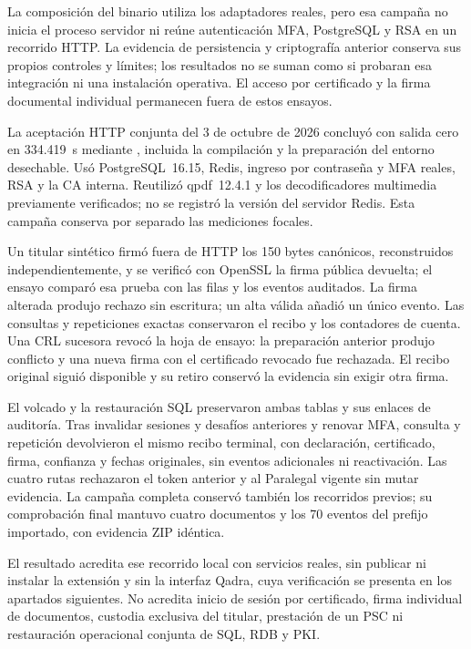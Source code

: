La composición del binario utiliza los adaptadores reales, pero esa campaña
no inicia el proceso servidor ni reúne autenticación MFA, PostgreSQL y RSA en
un recorrido HTTP. La evidencia de persistencia y criptografía anterior conserva
sus propios controles y límites; los resultados no se suman como si probaran
esa integración ni una instalación operativa. El acceso por certificado y la
firma documental individual permanecen fuera de estos ensayos.

La aceptación HTTP conjunta del 3 de octubre de 2026 concluyó con salida cero
en 334.419~s mediante , incluida la compilación
y la preparación del entorno desechable. Usó PostgreSQL~16.15, Redis, ingreso
por contraseña y MFA reales, RSA y la CA interna. Reutilizó qpdf~12.4.1 y los
decodificadores multimedia previamente verificados; no se registró la versión
del servidor Redis. Esta campaña conserva por separado las mediciones focales.

Un titular sintético firmó fuera de HTTP los 150 bytes canónicos, reconstruidos
independientemente, y se verificó con OpenSSL la firma pública devuelta; el
ensayo comparó esa prueba con las filas y los eventos auditados. La firma
alterada produjo rechazo sin escritura; un alta válida añadió un único evento. Las consultas y repeticiones
exactas conservaron el recibo y los contadores de cuenta. Una CRL sucesora
revocó la hoja de ensayo: la preparación anterior produjo conflicto y una
nueva firma con el certificado revocado fue rechazada. El recibo original
siguió disponible y su retiro conservó la evidencia sin exigir otra firma.

El volcado y la restauración SQL preservaron ambas tablas y sus enlaces de
auditoría. Tras invalidar sesiones y desafíos anteriores y renovar MFA,
consulta y repetición devolvieron el mismo recibo terminal, con declaración,
certificado, firma, confianza y fechas originales, sin eventos adicionales ni
reactivación. Las cuatro rutas rechazaron el token anterior y al Paralegal
vigente sin mutar evidencia. La campaña completa conservó también los
recorridos previos; su comprobación final mantuvo cuatro documentos y los 70
eventos del prefijo importado, con evidencia ZIP idéntica.

El resultado acredita ese recorrido local con servicios reales, sin publicar ni
instalar la extensión y sin la interfaz Qadra, cuya verificación se presenta en
los apartados siguientes. No acredita inicio de sesión por certificado, firma
individual de documentos, custodia exclusiva del titular, prestación de un PSC ni restauración operacional
conjunta de SQL, RDB y PKI.

